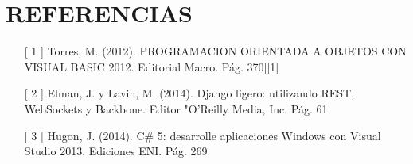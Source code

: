 \section{REFERENCIAS} 

\begin{itemize}
	\item [[ 1]]  Torres, M. (2012). PROGRAMACION ORIENTADA A OBJETOS CON VISUAL BASIC 2012. Editorial Macro. Pág. 370[[1]
 	\item   [[ 2]] Elman, J. y Lavin, M. (2014). Django ligero: utilizando REST, WebSockets y Backbone. Editor "O'Reilly Media, Inc. Pág. 61
	\item  [[ 3]]  Hugon, J. (2014). C\# 5: desarrolle aplicaciones Windows con Visual Studio 2013. Ediciones ENI. Pág. 269
\end{itemize}
